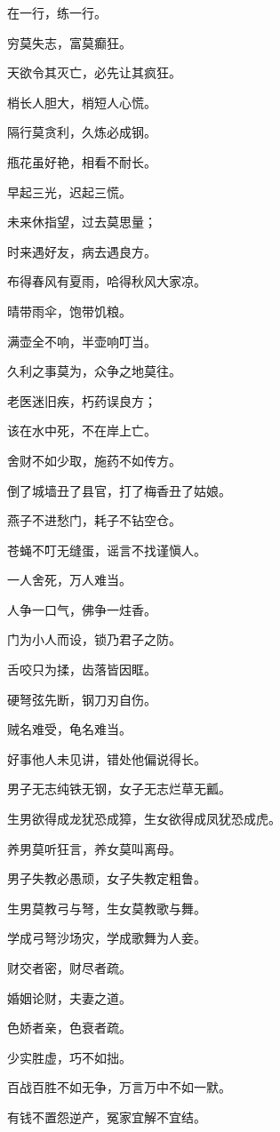 \documentclass[12pt,oneside]{book}
\begin{document}
在一行，练一行。

穷莫失志，富莫癫狂。

天欲令其灭亡，必先让其疯狂。

梢长人胆大，梢短人心慌。

隔行莫贪利，久炼必成钢。

甁花虽好艳，相看不耐长。

早起三光，迟起三慌。

未来休指望，过去莫思量；

时来遇好友，病去遇良方。

布得春风有夏雨，哈得秋风大家凉。

晴带雨伞，饱带饥粮。

满壶全不响，半壶响叮当。

久利之事莫为，众争之地莫往。

老医迷旧疾，朽药误良方；

该在水中死，不在岸上亡。

舍财不如少取，施药不如传方。

倒了城墙丑了县官，打了梅香丑了姑娘。

燕子不进愁门，耗子不钻空仓。

苍蝇不叮无缝蛋，谣言不找谨愼人。

一人舍死，万人难当。

人争一口气，佛争一炷香。

门为小人而设，锁乃君子之防。

舌咬只为揉，齿落皆因眶。

硬弩弦先断，钢刀刃自伤。

贼名难受，龟名难当。

好事他人未见讲，错处他偏说得长。

男子无志纯铁无钢，女子无志烂草无瓤。

生男欲得成龙犹恐成獐，生女欲得成凤犹恐成虎。

养男莫听狂言，养女莫叫离母。

男子失教必愚顽，女子失教定粗鲁。

生男莫教弓与弩，生女莫教歌与舞。

学成弓弩沙场灾，学成歌舞为人妾。

财交者密，财尽者疏。

婚姻论财，夫妻之道。

色娇者亲，色衰者疏。

少实胜虚，巧不如拙。

百战百胜不如无争，万言万中不如一默。

有钱不置怨逆产，冤家宜解不宜结。
\end{document}
